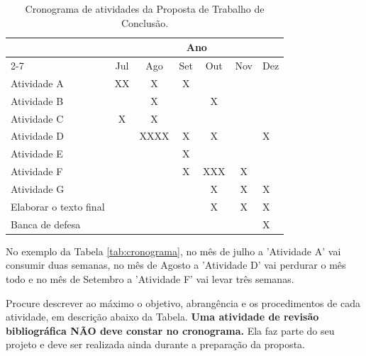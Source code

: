 \begin{table}[htb!]
\centering
\caption{Cronograma de atividades da Proposta de Trabalho de Conclusão.}
\label{tab:cronograma}
\begin{tabular}{|l|llllll|}
\hline
\rowcolor[HTML]{C0C0C0} 
  & \multicolumn{6}{c|}{Ano}                                        \\ 
\cline{2-7} 
\rowcolor[HTML]{C0C0C0} 
\multirow{-2}{*}{Atividades} & \multicolumn{1}{c|}{Jul} & \multicolumn{1}{c|}{Ago} & \multicolumn{1}{c|}{Set} & \multicolumn{1}{c|}{Out} & \multicolumn{1}{c|}{Nov} & Dez \\ \hline
Atividade A            & \multicolumn{1}{c|}{XX}   & \multicolumn{1}{c|}{X}    & \multicolumn{1}{c|}{X}   & \multicolumn{1}{c|}{}    & \multicolumn{1}{c|}{}    &   \\ 
\hline
Atividade B            & \multicolumn{1}{c|}{}     & \multicolumn{1}{c|}{X}    & \multicolumn{1}{c|}{}    & \multicolumn{1}{c|}{X}    & \multicolumn{1}{c|}{}    &  \\
\hline
Atividade C            & \multicolumn{1}{c|}{X}    & \multicolumn{1}{c|}{X}    & \multicolumn{1}{c|}{}    & \multicolumn{1}{c|}{}    & \multicolumn{1}{c|}{}    &   \\
\hline
Atividade D            & \multicolumn{1}{c|}{}     & \multicolumn{1}{c|}{XXXX} & \multicolumn{1}{c|}{X}   & \multicolumn{1}{c|}{X}   & \multicolumn{1}{c|}{}    & X \\
\hline
Atividade E            & \multicolumn{1}{c|}{}     & \multicolumn{1}{c|}{}     & \multicolumn{1}{c|}{X}   & \multicolumn{1}{c|}{}    & \multicolumn{1}{c|}{}    &   \\
\hline
Atividade F            & \multicolumn{1}{c|}{}     & \multicolumn{1}{c|}{}     & \multicolumn{1}{c|}{X}   & \multicolumn{1}{c|}{XXX} & \multicolumn{1}{c|}{X}    &   \\
\hline
Atividade G            & \multicolumn{1}{c|}{}     & \multicolumn{1}{c|}{}     & \multicolumn{1}{c|}{}    & \multicolumn{1}{c|}{X}    & \multicolumn{1}{c|}{X}    & X \\
\hline
Elaborar o texto final & \multicolumn{1}{c|}{}     & \multicolumn{1}{c|}{}     & \multicolumn{1}{c|}{}    & \multicolumn{1}{c|}{X}    & \multicolumn{1}{c|}{X}    & X \\
\hline
Banca de defesa        & \multicolumn{1}{c|}{}     & \multicolumn{1}{c|}{}     & \multicolumn{1}{c|}{}    & \multicolumn{1}{c|}{}    & \multicolumn{1}{c|}{}    & X \\
\hline
\end{tabular}
\end{table}

No exemplo da Tabela \autoref{tab:cronograma}, no mês de julho a 'Atividade A' vai consumir duas semanas, no mês de Agosto a 'Atividade D' vai perdurar o mês todo e no mês de Setembro a 'Atividade F' vai levar três semanas.

Procure descrever ao máximo o objetivo, abrangência e os procedimentos de cada atividade, em descrição abaixo da Tabela. \textbf{Uma atividade de revisão bibliográfica NÃO deve constar no cronograma.} Ela faz parte do seu projeto e deve ser realizada ainda durante a preparação da proposta.


